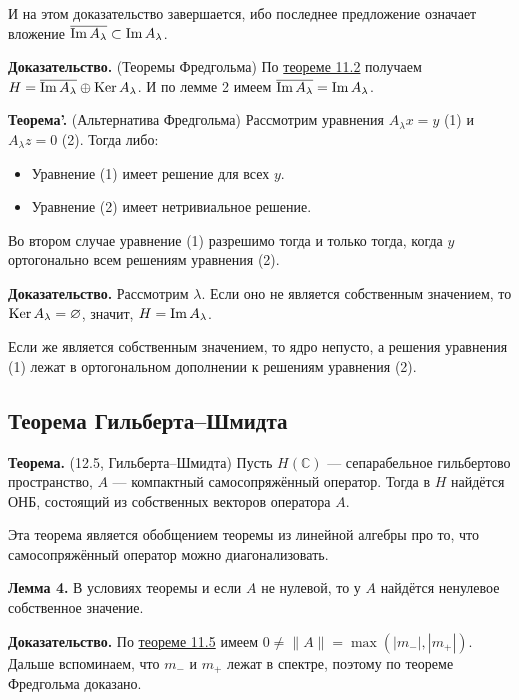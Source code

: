 И на этом доказательство завершается, ибо последнее предложение означает вложение $\overline{\operatorname{Im} A_\lambda} \subset \operatorname{Im} A_\lambda$.

\QED

\textbf{Доказательство.} (Теоремы Фредгольма) По \hyperref[th:11-2]{теореме 11.2} получаем $H = \overline{\operatorname{Im} A_\lambda} \oplus \operatorname{Ker} A_\lambda$.
И по лемме 2 имеем $\overline{\operatorname{Im} A_\lambda} = \operatorname{Im} A_\lambda$.

\QED

\textbf{Теорема'.} (Альтернатива Фредгольма) Рассмотрим уравнения $A_\lambda x = y$ (1) и $A_\lambda z = 0$ (2).
Тогда либо:
\begin{itemize}
    \item Уравнение (1) имеет решение для всех $y$.
    \item Уравнение (2) имеет нетривиальное решение.
\end{itemize}
Во втором случае уравнение (1) разрешимо тогда и только тогда, когда $y$ ортогонально всем решениям уравнения (2).

\textbf{Доказательство.} Рассмотрим $\lambda$.
Если оно не является собственным значением, то $\operatorname{Ker} A_\lambda = \varnothing$, значит, $H = \operatorname{Im} A_\lambda$.

Если же является собственным значением, то ядро непусто, а решения уравнения (1) лежат в ортогональном дополнении к решениям уравнения (2).

\QED

\subsection{Теорема Гильберта--Шмидта}

\label{th:12-5} \textbf{Теорема.} (12.5, Гильберта--Шмидта) Пусть $H(\mathbb C)$ --- сепарабельное гильбертово пространство, $A$ --- компактный самосопряжённый оператор.
Тогда в $H$ найдётся ОНБ, состоящий из собственных векторов оператора $A$.

Эта теорема является обобщением теоремы из линейной алгебры про то, что самосопряжённый оператор можно диагонализовать.

\textbf{Лемма 4.} В условиях теоремы и если $A$ не нулевой, то у $A$ найдётся ненулевое собственное значение.

\textbf{Доказательство.} По \hyperref[th:11-5]{теореме 11.5} имеем $0 \ne \|A\| = \max(|m_-|, |m_+|)$.
Дальше вспоминаем, что $m_-$ и $m_+$ лежат в спектре, поэтому по теореме Фредгольма доказано.

\QED

